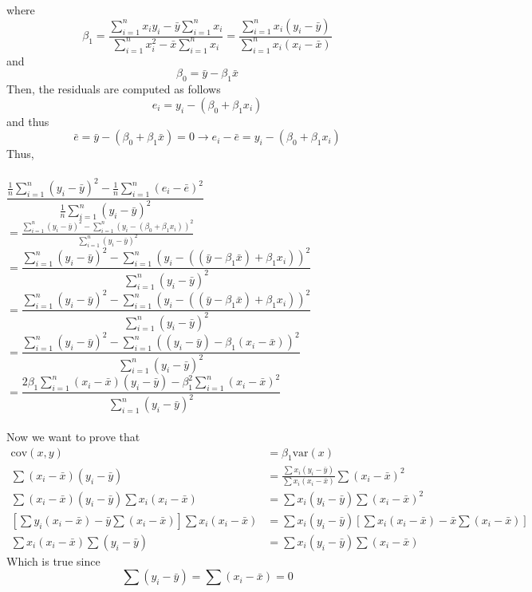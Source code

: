 \documentclass{article}
\begin{document}
\begin{enumerate}
\begin{enumerate}
        where
        \[\beta_1=\frac{\sum_{i=1}^{n}x_iy_i-\bar{y}\sum_{i=1}^{n}x_i}{\sum_{i=1}^{n}x_i^2-\bar{x}\sum_{i=1}^{n}x_i}=\frac{\sum_{i=1}^{n}x_i(y_i-\bar{y})}{\sum_{i=1}^{n}x_i(x_i-\bar{x})}\]
        and
        \[\beta_0=\bar{y}-\beta_1\bar{x}\]
        Then, the residuals are computed as follows
        \[e_i=y_i-(\beta_0+\beta_1x_i)\]
        and thus
        \[\bar{e}=\bar{y}-(\beta_0+\beta_1\bar{x})=0 \rightarrow e_i-\bar{e}=y_i-(\beta_0+\beta_1x_i)\]
        Thus,\\\\
        $\dfrac{\frac{1}{n}\sum_{i=1}^{n}(y_i-\bar{y})^2-\frac{1}{n}\sum_{i=1}^{n}(e_i-\bar{e})^2}{\frac{1}{n}\sum_{i=1}^{n}(y_i-\bar{y})^2}$\\ $=\frac{\sum_{i=1}^{n}(y_i-\bar{y})^2-\sum_{i=1}^{n}(y_i-(\beta_0+\beta_1x_i))^2}{\sum_{i=1}^{n}(y_i-\bar{y})^2}$\\
        $= \dfrac{\sum_{i=1}^{n}(y_i-\bar{y})^2-\sum_{i=1}^{n}(y_i-((\bar{y}-\beta_1\bar{x})+\beta_1x_i))^2}{\sum_{i=1}^{n}(y_i-\bar{y})^2}$\\
        $= \dfrac{\sum_{i=1}^{n}(y_i-\bar{y})^2-\sum_{i=1}^{n}(y_i-((\bar{y}-\beta_1\bar{x})+\beta_1x_i))^2}{\sum_{i=1}^{n}(y_i-\bar{y})^2}$\\
        $= \dfrac{\sum_{i=1}^{n}(y_i-\bar{y})^2-\sum_{i=1}^{n}((y_i-\bar{y})-\beta_1(x_i-\bar{x}))^2}{\sum_{i=1}^{n}(y_i-\bar{y})^2}$\\
        $= \dfrac{2\beta_1\sum_{i=1}^{n}(x_i-\bar{x})(y_i-\bar{y})-\beta_1^2\sum_{i=1}^{n}(x_i-\bar{x})^2}{\sum_{i=1}^{n}(y_i-\bar{y})^2}$\\\\
        Now we want to prove that
        \begin{align*}
            \text{cov}(x,y)&=\beta_1\text{var}(x)\\
            \sum(x_i-\bar{x})(y_i-\bar{y})&=\frac{\sum x_i(y_i-\bar{y})}{\sum x_i(x_i-\bar{x})}\sum(x_i-\bar{x})^2\\
            \sum(x_i-\bar{x})(y_i-\bar{y})\sum x_i(x_i-\bar{x}) &= \sum x_i(y_i-\bar{y})\sum(x_i-\bar{x})^2\\
            \left[\sum y_i(x_i-\bar{x}) - \bar{y}\sum (x_i-\bar{x})\right]\sum x_i(x_i-\bar{x}) &= \sum x_i(y_i-\bar{y})\left[\sum x_i(x_i-\bar{x})-\bar{x}\sum (x_i-\bar{x})\right]\\
            \sum x_i(x_i-\bar{x}) \sum(y_i-\bar{y}) &= \sum x_i(y_i-\bar{y}) \sum(x_i-\bar{x})
        \end{align*}
        Which is true since
        \[\sum(y_i-\bar{y})=\sum(x_i-\bar{x})=0\]

\end{enumerate}
\end{enumerate}
\end{document}
